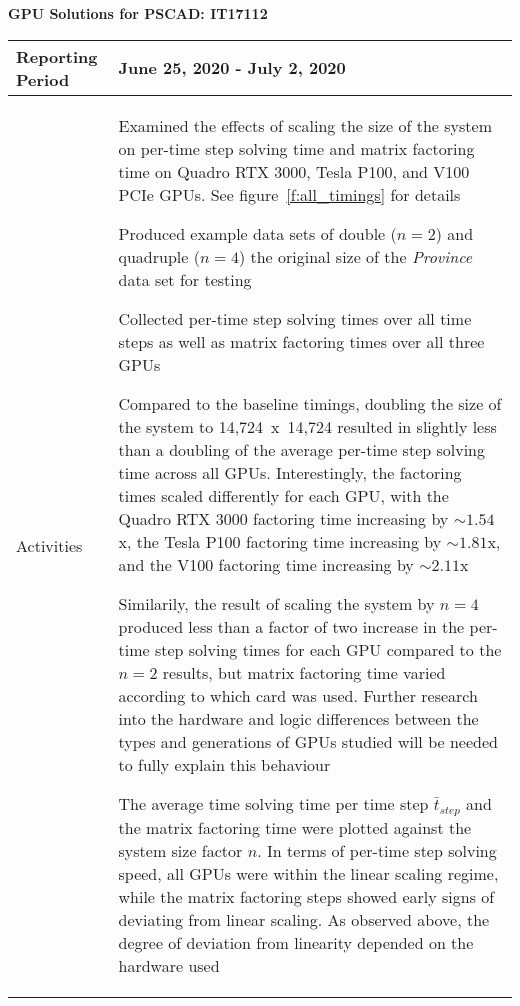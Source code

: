 \documentclass[11pt,letterpaper]{article}
\newcommand{\its}{\item[\tiny\textbullet]}
\begin{document}
\vspace{.2in}
\begin{center}
    {\bf GPU Solutions for PSCAD: IT17112}
\end{center}

\vspace{.25in}

\begin{tabular}{| p{} | p{} |}
	\hline
	Reporting Period & June 25, 2020 - July 2, 2020 \\ \hline

	Activities & \begin{enumerate*}
    \item[\tiny\textbullet] Examined the effects of scaling the size of the system on 
    per-time step solving time and matrix factoring time on Quadro RTX 3000, Tesla P100, 
    and V100 PCIe GPUs. See figure~\ref{f:all_timings} for details \newline
    \its Produced example data sets of double ($n=2$) and quadruple ($n=4$) the original size
    of the \emph{Province} data set for testing \newline
    \its Collected per-time step solving times over all time steps as well as matrix factoring times
    over all three GPUs \newline
    \its Compared to the baseline timings, doubling the size of the 
    system to 14,724~x~14,724 resulted in slightly less than a doubling of the average per-time 
    step solving time across all GPUs. Interestingly, the factoring times scaled differently for 
    each GPU, with the Quadro RTX 3000 factoring time increasing by ${\sim 1.54}$x, the Tesla P100
    factoring time increasing by ${\sim 1.81}$x, and the V100 factoring time increasing by ${\sim 2.11}$x \newline
    \its Similarily, the result of scaling the system by $n = 4$ produced less than a factor of two increase 
    in the per-time step solving times for each GPU compared to the $n = 2$ results, but matrix factoring time varied according to 
    which card was used. Further research into the hardware and logic differences between the types and generations of GPUs 
    studied will be needed to fully explain this behaviour \newline
    \its The average time solving time per time step $\bar t_{step}$ and the matrix factoring time were
    plotted against the system size factor $n$. In terms of per-time step solving speed, all GPUs were within
    the linear scaling regime, while the matrix factoring steps showed early signs of deviating from linear scaling. As
    observed above, the degree of deviation from linearity depended on the hardware used
    \end{enumerate*} \\ \hline


\end{tabular}
\end{document}
